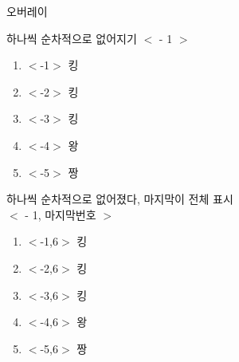 \documentclass[9pt,blue,xcolor=pdftex,dvipsnames,table,handout,notes]{beamer}
\begin{document}
\begin{frame}[t]{오버레이}

			\begin{block} {하나씩 순차적으로 없어지기 $<$ - 1 $>$}
			\begin{enumerate}
			\item <-1> $<$-1$>$ 킹
			\item <-2> $<$-2$>$ 킹
			\item <-3> $<$-3$>$ 킹
			\item <-4> $<$-4$>$ 왕
			\item <-5> $<$-5$>$ 짱
			\end{enumerate}
			\end{block}



			\begin{block} {하나씩 순차적으로 없어졌다, 마지막이 전체 표시\\
						 $<$ - 1, 마지막번호 $>$}
			\begin{enumerate}
			\item <-1,6> $<$-1,6$>$ 킹
			\item <-2,6> $<$-2,6$>$ 킹
			\item <-3,6> $<$-3,6$>$ 킹
			\item <-4,6> $<$-4,6$>$ 왕
			\item <-5,6> $<$-5,6$>$ 짱
			\end{enumerate}
			\end{block}

		\end{frame}
\end{document}

